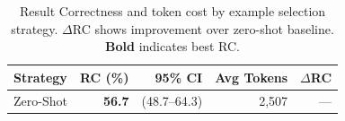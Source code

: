 \begin{table}[t]
\centering
\caption{Result Correctness and token cost by example selection strategy. $\Delta$RC shows improvement over zero-shot baseline. \textbf{Bold} indicates best RC.}
\label{tab:example_comparison}
\small
\begin{tabular}{lrrrr}
\toprule
Strategy & RC (\%) & 95\% CI & Avg Tokens & $\Delta$RC \\
\midrule
Zero-Shot & \textbf{56.7} & (48.7--64.3) & 2,507 & --- \\
\bottomrule
\end{tabular}
\end{table}